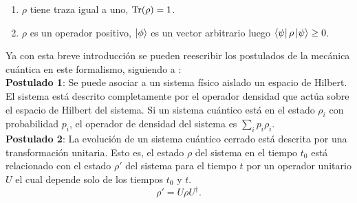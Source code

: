 \begin{enumerate}
\item $\rho$ tiene traza igual a uno, $\Tr(\rho)=1$.

\item $\rho$ es un operador positivo, $\ket{\phi}$ es un vector arbitrario luego $\bra{\psi}\rho\ket{\psi} \geq 0$.
\end{enumerate}
Ya con esta breve introducción se pueden reescribir los postulados de la mecánica cuántica en este formalismo, siguiendo a \cite{NielsenInformation}:
\\
\textbf{Postulado 1}: Se puede asociar a un sistema físico aislado un espacio de Hilbert. El sistema está descrito completamente por el operador densidad que actúa sobre el espacio de Hilbert del sistema. Si un sistema cuántico está en el estado $\rho_{i}$ con probabilidad $p_{i}$, el operador de densidad del sistema es $\sum_{i} p_{i} \rho_{i}$.
\\

\textbf{Postulado 2}: La evolución de un sistema cuántico cerrado está descrita por una transformación unitaria. Esto es,  el estado $\rho$ del sistema en el tiempo $t_{0}$ está relacionado con el estado $\rho'$ del sistema para el tiempo $t$ por un operador unitario $U$ el cual depende solo de los tiempos $t_{0}$ y $t$. 
\begin{equation}
\rho' = U \rho U^{\dagger}.
\end{equation}
\\

